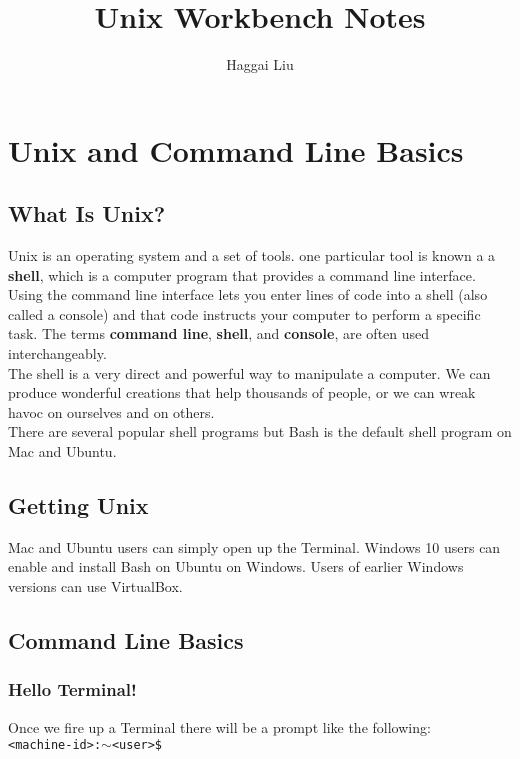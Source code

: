 \documentclass[12pt]{article}
\newcommand{\code}[1]{
\texttt{#1}
}
\begin{document}
	\title{Unix Workbench Notes}
	\author{Haggai Liu}
	\maketitle	
	
	\section{Unix and Command Line Basics}
		
		\subsection{What Is Unix?}
		 Unix is an operating system and a set of tools. one particular tool is known a a \textbf{shell}, which is a computer program that provides a command line interface. Using the command line interface lets you enter lines of code into a shell (also called a console) and that code instructs your computer to perform a specific task. The terms \textbf{command line}, \textbf{shell}, and \textbf{console}, are often used interchangeably.\\
		 
		 The shell is a very direct and powerful way to manipulate a computer. We can produce wonderful creations that help thousands of people, or we can wreak havoc on ourselves and on others.\\
		 
		 There are several popular shell programs but Bash is the default shell program on Mac and Ubuntu.
		 
		 \subsection{Getting Unix}
		 Mac and Ubuntu users can simply open up the Terminal. Windows 10 users can enable and install Bash on Ubuntu on Windows. Users of earlier Windows versions can use VirtualBox.
		 
		 \subsection{Command Line Basics}
		 
		 \subsubsection{Hello Terminal!}
		 Once we fire up a Terminal there will be a prompt like the following:\\
		 \code{<machine-id>:$\sim$<user>\$}\\
		 
\end{document}
